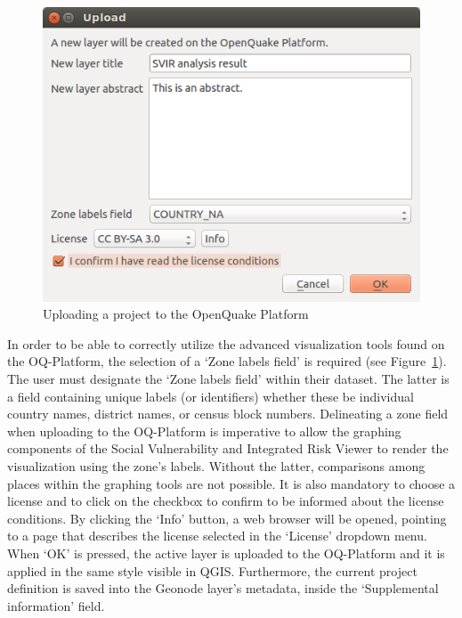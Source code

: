 \begin{figure}
    \centering
    \includegraphics[width=\textwidth]{../images/image25}
    \caption{Uploading a project to the OpenQuake Platform}
    \label{fig:upload_dialog}
\end{figure}

In order to be able to correctly utilize the advanced visualization tools found
on the OQ-Platform, the selection of a `Zone labels field' is required (see
Figure~\ref{fig:upload_dialog}). The user must designate the `Zone labels
field' within their dataset. The latter is a field containing unique labels (or
identifiers) whether these be individual country names, district names, or
census block numbers. Delineating a zone field when uploading to the
OQ-Platform is imperative to allow the graphing components of the Social
Vulnerability and Integrated Risk Viewer to render the visualization using the
zone's labels.  Without the latter, comparisons among places within the
graphing tools are not possible. It is also mandatory to choose a license and
to click on the checkbox to confirm to be informed about the license
conditions. By clicking the `Info' button, a web browser will be opened,
pointing to a page that describes the license selected in the `License'
dropdown menu. When `OK' is pressed, the active layer is uploaded to the
OQ-Platform and it is applied in the same style visible in QGIS\@. Furthermore,
the current project definition is saved into the Geonode layer's metadata,
inside the `Supplemental information' field.

